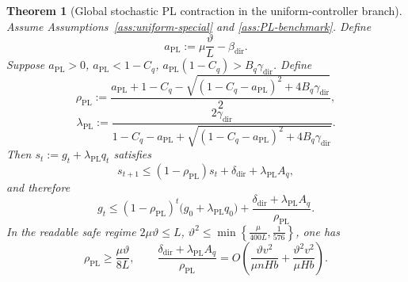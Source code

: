 \documentclass{article}
\newtheorem{theorem}{Theorem}[section]
\theoremstyle{definition}
\begin{document}
\begin{theorem}[Global stochastic PL contraction in the uniform-controller branch]
\label{th:pl-global}
Assume Assumptions~\ref{ass:uniform-special} and \ref{ass:PL-benchmark}. Define
\begin{equation}
a_{\mathrm{PL}}:=\mu\frac{\vartheta}{L}-\beta_{\mathrm{dir}}.
\label{eq:aPL-main}\end{equation}
Suppose $a_{\mathrm{PL}}>0$, $a_{\mathrm{PL}}<1-C_q$, $a_{\mathrm{PL}}(1-C_q)>B_q\gamma_{\mathrm{dir}}$.
Define
\[
\rho_{\mathrm{PL}}
:=
\frac{
a_{\mathrm{PL}}+1-C_q
-
\sqrt{(1-C_q-a_{\mathrm{PL}})^2+4B_q\gamma_{\mathrm{dir}}}
}{2},
\]
\begin{equation}
\lambda_{\mathrm{PL}}
:=
\frac{
2\gamma_{\mathrm{dir}}
}{
1-C_q-a_{\mathrm{PL}}+
\sqrt{(1-C_q-a_{\mathrm{PL}})^2+4B_q\gamma_{\mathrm{dir}}}
}.
\label{eq:lambdaPL-main}\end{equation}
Then $s_t:=g_t+\lambda_{\mathrm{PL}}q_t$
satisfies
\[
s_{t+1}
\le
(1-\rho_{\mathrm{PL}})s_t
+
\delta_{\mathrm{dir}}+\lambda_{\mathrm{PL}}A_q,
\]
and therefore
\[
g_t
\le
(1-\rho_{\mathrm{PL}})^t\bigl(g_0+\lambda_{\mathrm{PL}}q_0\bigr)
+
\frac{\delta_{\mathrm{dir}}+\lambda_{\mathrm{PL}}A_q}{\rho_{\mathrm{PL}}}.
\]
In the readable safe regime $2 \mu \vartheta \le L$, $\vartheta^2\le \min\!\left\{\frac{\mu}{400L},\frac1{576}\right\}$, one has
\begin{equation}
\rho_{\mathrm{PL}}\ge \frac{\mu\vartheta}{8L},
\qquad
\frac{\delta_{\mathrm{dir}}+\lambda_{\mathrm{PL}}A_q}{\rho_{\mathrm{PL}}}
=
O\!\left(\frac{\vartheta v^2}{\mu n H b}+\frac{\vartheta^2 v^2}{\mu H b}\right).
\label{eq:pl-floor-main}\end{equation}
\end{theorem}
\end{document}
